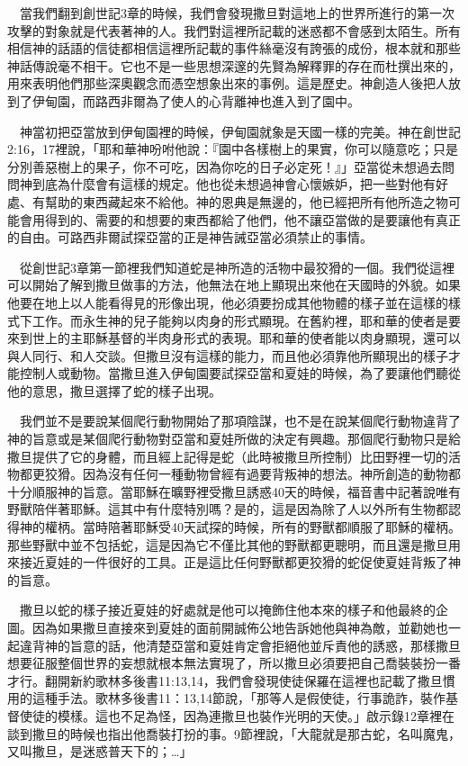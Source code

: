 \documentclass{book}
\begin{document}
　當我們翻到創世記3章的時候，我們會發現撒旦對這地上的世界所進行的第一次攻擊的對象就是代表著神的人。我們對這裡所記載的迷惑都不會感到太陌生。所有相信神的話語的信徒都相信這裡所記載的事件絲毫沒有誇張的成份，根本就和那些神話傳說毫不相干。它也不是一些思想深邃的先賢為解釋罪的存在而杜撰出來的，用來表明他們那些深奧觀念而憑空想象出來的事例。這是歷史。神創造人後把人放到了伊甸園，而路西非爾為了使人的心背離神也進入到了園中。

　神當初把亞當放到伊甸園裡的時候，伊甸園就象是天國一樣的完美。神在創世記2:16，17裡說，「耶和華神吩咐他說：『園中各樣樹上的果實，你可以隨意吃；只是分別善惡樹上的果子，你不可吃，因為你吃的日子必定死！』」亞當從未想過去問問神到底為什麼會有這樣的規定。他也從未想過神會心懷嫉妒，把一些對他有好處、有幫助的東西藏起來不給他。神的恩典是無邊的，他已經把所有他所造之物可能會用得到的、需要的和想要的東西都給了他們，他不讓亞當做的是要讓他有真正的自由。可路西非爾試探亞當的正是神告誡亞當必須禁止的事情。

　從創世記3章第一節裡我們知道蛇是神所造的活物中最狡猾的一個。我們從這裡可以開始了解到撒旦做事的方法，他無法在地上顯現出來他在天國時的外貌。如果他要在地上以人能看得見的形像出現，他必須要扮成其他物體的樣子並在這樣的樣式下工作。而永生神的兒子能夠以肉身的形式顯現。在舊約裡，耶和華的使者是要來到世上的主耶穌基督的半肉身形式的表現。耶和華的使者能以肉身顯現，還可以與人同行、和人交談。但撒旦沒有這樣的能力，而且他必須靠他所顯現出的樣子才能控制人或動物。當撒旦進入伊甸園要試探亞當和夏娃的時候，為了要讓他們聽從他的意思，撒旦選擇了蛇的樣子出現。

　我們並不是要說某個爬行動物開始了那項陰謀，也不是在說某個爬行動物違背了神的旨意或是某個爬行動物對亞當和夏娃所做的決定有興趣。那個爬行動物只是給撒旦提供了它的身體，而且經上記得是蛇（此時被撒旦所控制）比田野裡一切的活物都更狡猾。因為沒有任何一種動物曾經有過要背叛神的想法。神所創造的動物都十分順服神的旨意。當耶穌在曠野裡受撒旦誘惑40天的時候，福音書中記著說唯有野獸陪伴著耶穌。這其中有什麼特別嗎？是的，這是因為除了人以外所有生物都認得神的權柄。當時陪著耶穌受40天試探的時候，所有的野獸都順服了耶穌的權柄。那些野獸中並不包括蛇，這是因為它不僅比其他的野獸都更聰明，而且還是撒旦用來接近夏娃的一件很好的工具。正是這比任何野獸都更狡猾的蛇促使夏娃背叛了神的旨意。

　撒旦以蛇的樣子接近夏娃的好處就是他可以掩飾住他本來的樣子和他最終的企圖。因為如果撒旦直接來到夏娃的面前開誠佈公地告訴她他與神為敵，並勸她也一起違背神的旨意的話，他清楚亞當和夏娃肯定會拒絕他並斥責他的誘惑，那樣撒旦想要征服整個世界的妄想就根本無法實現了，所以撒旦必須要把自己喬裝裝扮一番才行。翻開新約歌林多後書11:13,14，我們會發現使徒保羅在這裡也記載了撒旦慣用的這種手法。歌林多後書11：13,14節說，「那等人是假使徒，行事詭詐，裝作基督使徒的模樣。這也不足為怪，因為連撒旦也裝作光明的天使。」啟示錄12章裡在談到撒旦的時候也指出他喬裝打扮的事。9節裡說，「大龍就是那古蛇，名叫魔鬼，又叫撒旦，是迷惑普天下的；…」
\end{document}
